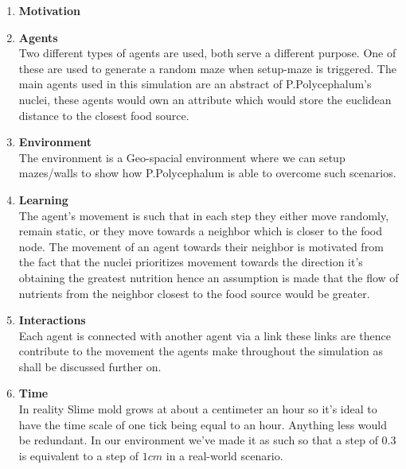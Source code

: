 \documentclass[a4paper, 11pt]{article}
\begin{document}
\begin{enumerate}
    \item \textbf{Motivation}
    
    \item \textbf{Agents}\\
    Two different types of agents are used, both serve a different purpose. One of these are used to generate a random maze when setup-maze is triggered. The main agents used in this simulation are an abstract of P.Polycephalum’s nuclei, these agents would own an attribute which would store the euclidean distance to the closest food source.
    
    \item \textbf{Environment}\\
    The environment is a Geo-spacial environment where we can setup mazes/walls to show how P.Polycephalum is able to overcome such scenarios.
    
    \item \textbf{Learning}\\
    The agent's movement is such that in each step they either move randomly, remain static, or they move towards a neighbor which is closer to the food node. The movement of an agent towards their neighbor is motivated from the fact that the nuclei prioritizes movement towards the direction it's obtaining the greatest nutrition hence an assumption is made that the flow of nutrients from the neighbor closest to the food source would be greater.
    
    \item \textbf{Interactions}\\
    Each agent is connected with another agent via a link these links are thence contribute to the movement the agents make throughout the simulation as shall be discussed further on.
    
    \item \textbf{Time}\\
    In reality Slime mold grows at about a centimeter an hour so it’s ideal to have the time scale of one tick being equal to an hour. Anything less would be redundant. In our environment we've made it as such so that a step of $0.3$ is equivalent to a step of $1 cm$ in a real-world scenario.
    

\end{enumerate}
\end{document}
